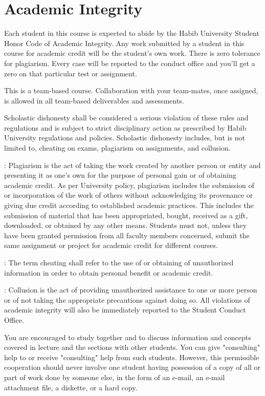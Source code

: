 \documentclass[a4paper]{article}
\newcommand{\new}[1]{{#1}}
\begin{document}
\section{Academic Integrity}

Each student in this course is expected to abide by the Habib University Student Honor Code of Academic Integrity.  Any work submitted by a student in this course for academic credit will be the student's own work. There is zero tolerance for plagiarism. Every case will be reported to the conduct office and you'll get a zero on that particular test or assignment.

\new{This is a team-based course. Collaboration with your team-mates, once assigned, is allowed in all team-based deliverables and assessments.}

Scholastic dishonesty shall be considered a serious violation of these rules and regulations and is subject to strict disciplinary action as prescribed by Habib University regulations and policies. Scholastic dishonesty includes, but is not limited to, cheating on exams, plagiarism on assignments, and collusion. 

: Plagiarism is the act of taking the work created by another person or entity and presenting it as one’s own for the purpose of personal gain or of obtaining academic credit. As per University policy, plagiarism includes the submission of or incorporation of the work of others without acknowledging its provenance or giving due credit according to established academic practices. This includes the submission of material that has been appropriated, bought, received as a gift, downloaded, or obtained by any other means. Students must not, unless they have been granted permission from all faculty members concerned, submit the same assignment or project for academic credit for different courses. 

: The term cheating shall refer to the use of or obtaining of unauthorized information in order to obtain personal benefit or academic credit. 

: Collusion is the act of providing unauthorized assistance to one or more person or of not taking the appropriate precautions against doing so. 
All violations of academic integrity will also be immediately reported to the Student Conduct Office.  

You are encouraged to study together and to discuss information and concepts covered in lecture and the sections with other students. You can give "consulting" help to or receive "consulting" help from such students. However, this permissible cooperation should never involve one student having possession of a copy of all or part of work done by someone else, in the form of an e-mail, an e-mail attachment file, a diskette, or a hard copy. 
\end{document}
